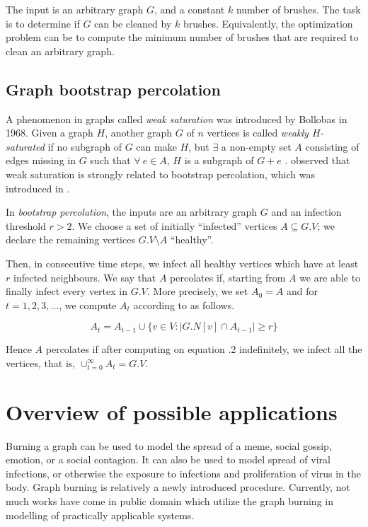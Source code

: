 The input is an arbitrary graph $G$, and a constant $k$ number of brushes. The task is to determine if $G$ can be cleaned by $k$ brushes. Equivalently, the optimization problem can be to compute the minimum number of brushes that are required to clean an arbitrary graph.

\subsection{Graph bootstrap percolation}

A phenomenon in graphs called \textit{weak saturation} was introduced by Bollobas in 1968. Given a graph $H$, another graph $G$ of $n$ vertices is called \textit{weakly $H$-saturated} if no subgraph of $G$ can make $H$, but $\exists$ a non-empty set $A$ consisting of edges missing in $G$ such that $\forall\ e \in A$, $H$ is a subgraph of $G+e$ \cite{Faudree2013,Balogh2012,Bollobas2017}. \cite{Balogh2012} observed that weak saturation is strongly related to bootstrap percolation, which was introduced in \cite{Chalupa1979}. \nocite{Faudree2013}

In \textit{bootstrap percolation}, the inputs are an arbitrary graph $G$ and an infection threshold $r>2$. We choose a set of initially ``infected'' vertices $A \subseteq G.V$; we declare the remaining vertices $G.V \setminus A$ ``healthy''.

Then, in consecutive time steps, we infect all healthy vertices which have at least $r$ infected neighbours.  We say that $A$ percolates if, starting from $A$ we are able to finally infect every vertex in $G.V$. More precisely, we set $A_0=A$ and for $t= 1,2,3,...$, we compute $A_t$ according to  \cite{Faudree2013} as follows.

\begin{equation}\label{equation:bootstrap-percolation}
    A_t = A_{t-1} \cup \{v\in V: | G.N[v]\cap A_{t-1}| \geq r\}
\end{equation}

Hence $A$ percolates if after computing on equation \thech.2 indefinitely, we infect all the vertices, that is, $\mathop{\cup}_{t=0}^\infty A_t = G.V$.

\section{Overview of possible applications}

Burning a graph can be used to model the spread of a meme, social gossip, emotion, or a social contagion. It can also be used to model spread of viral infections, or otherwise the exposure to infections and proliferation of virus in the body.
Graph burning is relatively a newly introduced procedure. Currently, not much works have come in public domain which utilize the graph burning in modelling of practically applicable systems.

